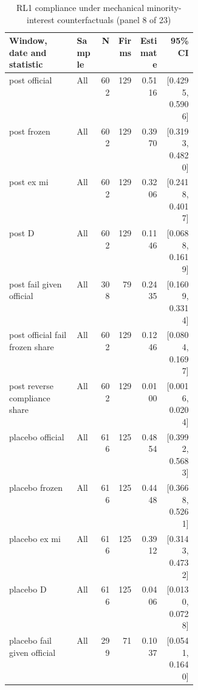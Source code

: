 \begin{table}[!htbp]\centering\scriptsize
\caption{RL1 compliance under mechanical minority-interest counterfactuals (panel 8 of 23)}
\begin{threeparttable}
\begin{tabular}{p{0.36\linewidth}lrrrr}
\toprule
Window, date and statistic & Sample & N & Firms & Estimate & 95\% CI \\
\midrule
post  official & All & 602 & 129 & 0.5116 & [0.4295, 0.5906] \\
post  frozen & All & 602 & 129 & 0.3970 & [0.3193, 0.4820] \\
post  ex mi & All & 602 & 129 & 0.3206 & [0.2418, 0.4017] \\
post  D & All & 602 & 129 & 0.1146 & [0.0688, 0.1619] \\
post  fail given official & All & 308 & 79 & 0.2435 & [0.1609, 0.3314] \\
post  official fail frozen share & All & 602 & 129 & 0.1246 & [0.0804, 0.1697] \\
post  reverse compliance share & All & 602 & 129 & 0.0100 & [0.0016, 0.0204] \\
placebo  official & All & 616 & 125 & 0.4854 & [0.3992, 0.5683] \\
placebo  frozen & All & 616 & 125 & 0.4448 & [0.3668, 0.5261] \\
placebo  ex mi & All & 616 & 125 & 0.3912 & [0.3143, 0.4732] \\
placebo  D & All & 616 & 125 & 0.0406 & [0.0130, 0.0728] \\
placebo  fail given official & All & 299 & 71 & 0.1037 & [0.0541, 0.1640] \\
\bottomrule
\end{tabular}
\begin{tablenotes}[flushleft]\footnotesize

\end{tablenotes}
\end{threeparttable}
\end{table}
